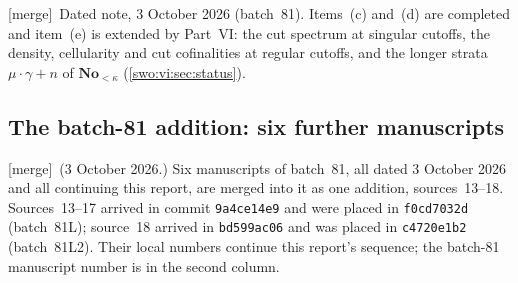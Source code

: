 \documentclass[11pt]{article}
\theoremstyle{definition}
\theoremstyle{remark}
\newcommand{\No}{\mathbf{No}}
\newcommand{\code}[1]{\texttt{\small #1}}
\newcommand{\merge}{\textsf{[merge]}}
\begin{document}
\smallskip
\merge\ Dated note, 3 October 2026 (batch~81). Items~(c) and~(d) are completed
and item~(e) is extended by Part~VI: the cut spectrum at singular cutoffs, the
density, cellularity and cut cofinalities at regular cutoffs, and the longer
strata $\mu\cdot\gamma+n$ of $\No_{<\kappa}$ (\cref{swo:vi:sec:status}).

\subsection{The batch-81 addition: six further manuscripts}\label{swo:sub:batch81}

\merge\ (3 October 2026.) Six manuscripts of batch~81, all dated 3 October
2026 and all continuing this report, are merged into it as one addition,
sources~13--18. Sources~13--17 arrived in commit \code{9a4ce14e9} and were
placed in \code{f0cd7032d} (batch~81L); source~18 arrived in \code{bd599ac06}
and was placed in \code{c4720e1b2} (batch~81L2). Their local numbers continue
this report's sequence; the batch-81 manuscript number is in the second
column.
\end{document}
